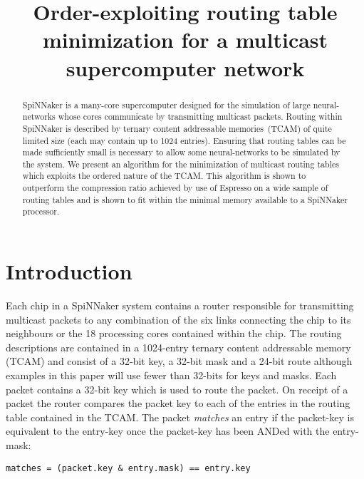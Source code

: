 \documentclass[conference]{IEEEtran}
\title{Order-exploiting routing table minimization for a multicast supercomputer network}
\author{%
  \IEEEauthorblockN{Andrew Mundy and Jim Garside}
  \IEEEauthorblockA{\{\texttt{andrew.mundy}, \texttt{jim.garside}\}\texttt{@manchester.ac.uk}\\
                    School of Computer Science,\\
		    University of Manchester,\\
                    M13 9PL, UK}
}
\begin{document}
  \maketitle

  \begin{abstract}
    SpiNNaker is a many-core supercomputer designed for the simulation of large neural-networks whose cores communicate by transmitting multicast packets.
    Routing within SpiNNaker is described by ternary content addressable memories~(TCAM) of quite limited size (each may contain up to 1024 entries).
    Ensuring that routing tables can be made sufficiently small is necessary to allow some neural-networks to be simulated by the system.
    We present an algorithm for the minimization of multicast routing tables which exploits the ordered nature of the TCAM.
    This algorithm is shown to outperform the compression ratio achieved by use of Espresso on a wide sample of routing tables and is shown to fit within the minimal memory available to a SpiNNaker processor.
  \end{abstract}

  \section{Introduction}

  Each chip in a SpiNNaker system contains a router responsible for transmitting multicast packets to any combination of the six links connecting the chip to its neighbours or the 18 processing cores contained within the chip.
  The routing descriptions are contained in a 1024-entry ternary content addressable memory (TCAM) and consist of a 32-bit key, a 32-bit mask and a 24-bit route although examples in this paper will use fewer than 32-bits for keys and masks.
  Each packet contains a 32-bit key which is used to route the packet.
  On receipt of a packet the router compares the packet key to each of the entries in the routing table contained in the TCAM.
  The packet \textit{matches} an entry if the packet-key is equivalent to the entry-key once the packet-key has been ANDed with the entry-mask:

  \noindent\texttt{\small matches = (packet.key \& entry.mask) == entry.key}
\end{document}
